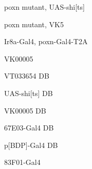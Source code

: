 \documentclass[17pt]{extarticle}
\begin{document}
\footnotesize
\newpage\vspace*{-0.15cm}
\begin{footnotesize}
poxn mutant, UAS-shi[ts] \\[0.5em]
\end{footnotesize}
\footnotesize
\newpage\vspace*{-0.15cm}
\begin{footnotesize}
poxn mutant, VK5 \\[0.5em]
\end{footnotesize}
\footnotesize
\newpage\vspace*{-0.15cm}
\begin{footnotesize}
Ir8a-Gal4, poxn-Gal4-T2A \\[0.5em]
\end{footnotesize}
\footnotesize
\newpage\vspace*{-0.15cm}
\begin{large}
VK00005 \\[0.5em]
\end{large}
\footnotesize
\newpage\vspace*{-0.15cm}
\begin{normalsize}
VT033654 DB \\[0.5em]
\end{normalsize}
\footnotesize
\newpage\vspace*{-0.15cm}
\begin{normalsize}
UAS-shi[ts] DB \\[0.5em]
\end{normalsize}
\footnotesize
\newpage\vspace*{-0.15cm}
\begin{large}
VK00005 DB \\[0.5em]
\end{large}
\footnotesize
\newpage\vspace*{-0.15cm}
\begin{normalsize}
67E03-Gal4 DB \\[0.5em]
\end{normalsize}
\footnotesize
\newpage\vspace*{-0.15cm}
\begin{normalsize}
p[BDP]-Gal4 DB \\[0.5em]
\end{normalsize}
\footnotesize
\newpage\vspace*{-0.15cm}
\begin{large}
83F01-Gal4 \\[0.5em]
\end{large}
\footnotesize
\end{document}
